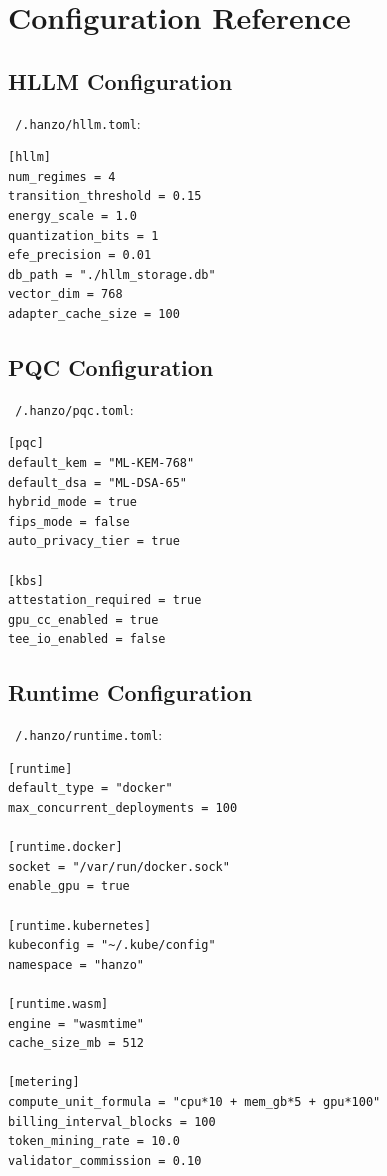 \section{Configuration Reference}


\subsection{HLLM Configuration}

\texttt{~/.hanzo/hllm.toml}:

\begin{lstlisting}
[hllm]
num_regimes = 4
transition_threshold = 0.15
energy_scale = 1.0
quantization_bits = 1
efe_precision = 0.01
db_path = "./hllm_storage.db"
vector_dim = 768
adapter_cache_size = 100
\end{lstlisting}

\subsection{PQC Configuration}

\texttt{~/.hanzo/pqc.toml}:

\begin{lstlisting}
[pqc]
default_kem = "ML-KEM-768"
default_dsa = "ML-DSA-65"
hybrid_mode = true
fips_mode = false
auto_privacy_tier = true

[kbs]
attestation_required = true
gpu_cc_enabled = true
tee_io_enabled = false
\end{lstlisting}

\subsection{Runtime Configuration}

\texttt{~/.hanzo/runtime.toml}:

\begin{lstlisting}
[runtime]
default_type = "docker"
max_concurrent_deployments = 100

[runtime.docker]
socket = "/var/run/docker.sock"
enable_gpu = true

[runtime.kubernetes]
kubeconfig = "~/.kube/config"
namespace = "hanzo"

[runtime.wasm]
engine = "wasmtime"
cache_size_mb = 512

[metering]
compute_unit_formula = "cpu*10 + mem_gb*5 + gpu*100"
billing_interval_blocks = 100
token_mining_rate = 10.0
validator_commission = 0.10
\end{lstlisting}

